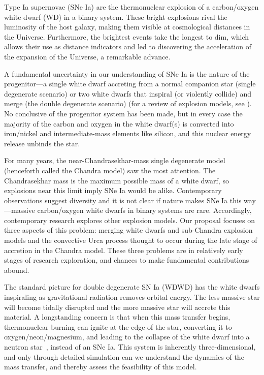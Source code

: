 Type Ia supernovae (SNe Ia) are the thermonuclear explosion of a  
carbon/oxygen white dwarf (WD) in a binary system.  These 
bright explosions rival the luminosity of the host galaxy,
making them visible at cosmological distances in the Universe. Furthermore,
the brightest events take the longest to dim, which allows their 
use as distance indicators and led to discovering
the acceleration of the expansion of the Universe, a
remarkable advance.

A fundamental uncertainty in our understanding of SNe Ia is the nature
of the progenitor---a single white dwarf accreting from a normal
companion star (single degenerate scenario) or two white dwarfs that
inspiral (or violently collide) and merge (the double degenerate
scenario) (for a review of explosion models, see \cite{calder:2013}).
No conclusive of the progenitor system has been made,
but in every case the majority of the carbon and
oxygen in the white dwarf(s) is converted into iron/nickel and
intermediate-mass elements like silicon, and this nuclear energy
release unbinds the star.

For many years, the near-Chandrasekhar-mass single degenerate model
(henceforth called the Chandra model) saw the most attention.  The
Chandrasekhar mass is the maximum possible mass of a white
dwarf, so explosions near this limit imply SNe Ia would be alike. 
Contemporary observations suggest diversity and it is not 
clear if nature makes SNe Ia this way---massive
carbon/oxygen white dwarfs in binary systems are rare.  Accordingly,
contemporary research explores other explosion models. Our proposal
focuses on three aspects of this problem: merging white dwarfs
and sub-Chandra explosion models and the convective Urca process
thought to occur during the late stage of accretion in the 
Chandra model. These three problems are in relatively early stages
of research exploration, and chances to make fundamental 
contributions abound. 

The standard picture for double degenerate SN Ia (WDWD) has the
white dwarfs inspiraling as gravitational radiation
removes orbital energy.  The less massive star will
become tidally disrupted and the more massive star will accrete this
material.  A longstanding concern is that when this mass transfer
begins, thermonuclear burning can ignite at the edge of the star,
converting it to oxygen/neon/magnesium, and leading to the collapse of
the white dwarf into a neutron
star~\cite{saionomoto:2004,fryerdiehl:2008}, instead of an SNe Ia.
This system is inherently three-dimensional, and only through detailed
simulation can we understand the dynamics of the mass transfer, and
thereby assess the feasibility of this model.  

